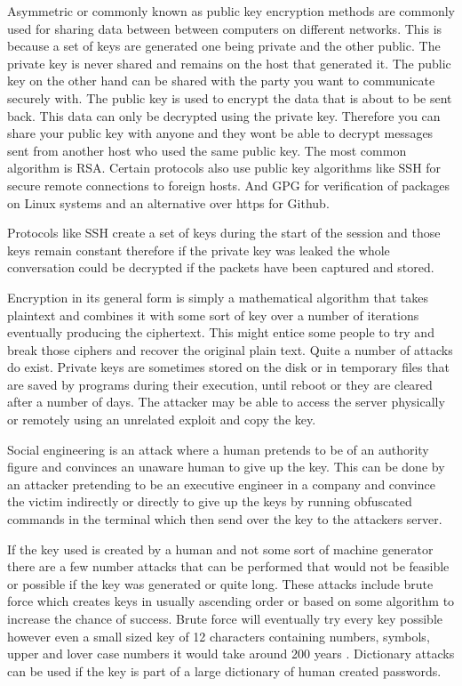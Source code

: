 Asymmetric or commonly known as public key encryption methods are commonly used for sharing data between between computers on different networks. This is because a set of keys are generated one being private and the other public. The private key is never shared and remains on the host that generated it. The public key on the other hand can be shared with the party you want to communicate securely with. The public key is used to encrypt the data that is about to be sent back. This data can only be decrypted using the private key. Therefore you can share your public key with anyone and they wont be able to decrypt messages sent from another host who used the same public key. The most common algorithm is RSA. Certain protocols also use public key algorithms like SSH for secure remote connections to foreign hosts. And GPG for verification of packages on Linux systems and an alternative over https for Github.

Protocols like SSH create a set of keys during the start of the session and those keys remain constant therefore if the private key was leaked the whole conversation could be decrypted if the packets have been captured and stored.  

Encryption in its general form is simply a mathematical algorithm that takes plaintext and combines it with some sort of key over a number of iterations eventually producing the ciphertext. This might entice some people to try and break those ciphers and recover the original plain text. Quite a number of attacks do exist.
Private keys are sometimes stored on the disk or in temporary files that are saved by programs during their execution, until reboot or they are cleared after a number of days. The attacker may be able to access the server physically or remotely using an unrelated exploit and copy the key.

Social engineering is an attack where a human pretends to be of an authority figure and convinces an unaware human to give up the key. This can be done by an attacker pretending to be an executive engineer in a company and convince the victim indirectly or directly to give up the keys by running obfuscated commands in the terminal which then send over the key to the attackers server.

If the key used is created by a human and not some sort of machine generator there are a few number attacks that can be performed that would not be feasible or possible if the key was generated or quite long. These attacks include brute force which creates keys in usually ascending order or based on some algorithm to increase the chance of success. Brute force will eventually try every key possible however even a small sized key of 12 characters containing numbers, symbols, upper and lover case numbers it would take around 200 years \cite{brute}. 
Dictionary attacks can be used if the key is part of a large dictionary of human created passwords. 


